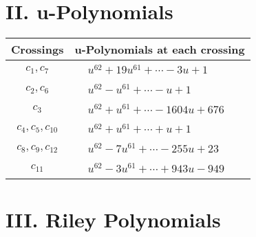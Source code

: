 \documentclass[1p]{elsarticle_modified}
\theoremstyle{definition}
\begin{document}
\newpage\renewcommand{\arraystretch}{1}
\centering \section*{ II. u-Polynomials}
\begin{tabular}{m{50pt}|m{274pt}}
Crossings & \hspace{64pt}u-Polynomials at each crossing \\
\hline $$\begin{aligned}c_{1},c_{7}\end{aligned}$$&$\begin{aligned}
&u^{62}+19 u^{61}+\cdots-3 u+1
\end{aligned}$\\
\hline $$\begin{aligned}c_{2},c_{6}\end{aligned}$$&$\begin{aligned}
&u^{62}- u^{61}+\cdots- u+1
\end{aligned}$\\
\hline $$\begin{aligned}c_{3}\end{aligned}$$&$\begin{aligned}
&u^{62}+u^{61}+\cdots-1604 u+676
\end{aligned}$\\
\hline $$\begin{aligned}c_{4},c_{5},c_{10}\end{aligned}$$&$\begin{aligned}
&u^{62}+u^{61}+\cdots+u+1
\end{aligned}$\\
\hline $$\begin{aligned}c_{8},c_{9},c_{12}\end{aligned}$$&$\begin{aligned}
&u^{62}-7 u^{61}+\cdots-255 u+23
\end{aligned}$\\
\hline $$\begin{aligned}c_{11}\end{aligned}$$&$\begin{aligned}
&u^{62}-3 u^{61}+\cdots+943 u-949
\end{aligned}$\\
\hline
\end{tabular}\newpage\renewcommand{\arraystretch}{1}
\centering \section*{ III. Riley Polynomials}
\end{document}
